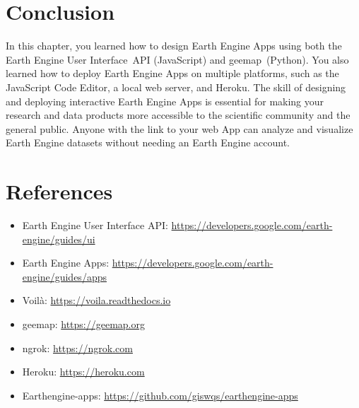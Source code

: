 \documentclass[
  letterpaper,
  DIV=11,
  numbers=noendperiod]{scrreprt}
\providecommand{\tightlist}{%
  \setlength{\itemsep}{0pt}\setlength{\parskip}{0pt}}\usepackage{longtable,booktabs,array}
\begin{document}
\hypertarget{conclusion-23}{%
\section*{Conclusion}\label{conclusion-23}}


In this chapter, you learned how to design Earth Engine Apps using both
the Earth Engine User Interface~API (JavaScript) and geemap~(Python).
You also learned how to deploy Earth Engine Apps on multiple platforms,
such as the JavaScript Code Editor, a local web server, and Heroku. The
skill of designing and deploying interactive Earth Engine Apps is
essential for making your research and data products more accessible to
the scientific community and the general public. Anyone with the link to
your web App can analyze and visualize Earth Engine datasets without
needing an Earth Engine account.

\hypertarget{references-17}{%
\section*{References}\label{references-17}}


\begin{itemize}
\tightlist
\item
  Earth Engine User Interface API:
  \href{https://www.google.com/url?q=https://developers.google.com/earth-engine/guides/ui\&sa=D\&source=editors\&ust=1671458841355402\&usg=AOvVaw1ZgOA5XvSnn5Uo83ccgHPT}{https://developers.google.com/earth-engine/guides/ui}~
\item
  Earth Engine Apps:
  \href{https://www.google.com/url?q=https://developers.google.com/earth-engine/guides/apps\&sa=D\&source=editors\&ust=1671458841355890\&usg=AOvVaw1ZYwRsMtxZ2RPAn-dC-E0n}{https://developers.google.com/earth-engine/guides/apps}~
\item
  Voilà:
  \href{https://www.google.com/url?q=https://voila.readthedocs.io\&sa=D\&source=editors\&ust=1671458841356320\&usg=AOvVaw1_h1OkQnXAvfEh717DURMY}{https://voila.readthedocs.io}
\item
  geemap:
  \href{https://www.google.com/url?q=https://geemap.org\&sa=D\&source=editors\&ust=1671458841356762\&usg=AOvVaw3ednZ3gbVzDuptXKRZgKCT}{https://geemap.org}
\item
  ngrok:
  \href{https://www.google.com/url?q=https://ngrok.com\&sa=D\&source=editors\&ust=1671458841357236\&usg=AOvVaw11-kfA1McHDaqztFMUrmtP}{https://ngrok.com}
\item
  Heroku:
  \href{https://www.google.com/url?q=https://heroku.com\&sa=D\&source=editors\&ust=1671458841357713\&usg=AOvVaw15mVX-rHKo54H2oq0Msd2Z}{https://heroku.com}~
\item
  Earthengine-apps:
  \href{https://www.google.com/url?q=https://github.com/giswqs/earthengine-apps\&sa=D\&source=editors\&ust=1671458841358120\&usg=AOvVaw2XD4jjXV9SfPmaC-oLbstc}{https://github.com/giswqs/earthengine-apps}~
  ~
\end{itemize}
\end{document}
